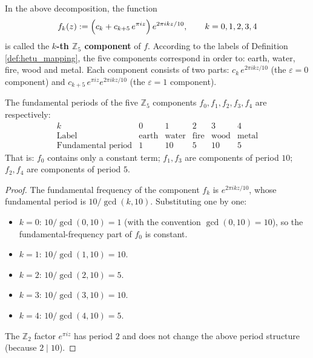 \begin{definition}\label{def:hetu_five_components}
In the above decomposition, the function
\[
f_k(z) := \Bigl( c_k + c_{k+5}\, e^{\pi i z} \Bigr)\, e^{2\pi i k z / 10}, \qquad k = 0, 1, 2, 3, 4
\]
is called the \textbf{$k$-th $\mathbb{Z}_5$ component} of $f$. According to the labels of Definition \ref{def:hetu_mapping}, the five components correspond in order to: earth, water, fire, wood and metal. Each component consists of two parts: $c_k\, e^{2\pi i k z / 10}$ (the $\varepsilon = 0$ component) and $c_{k+5}\, e^{\pi i z} e^{2\pi i k z / 10}$ (the $\varepsilon = 1$ component).
\end{definition}

\begin{proposition}\label{prop:hetu_five_periods}
The fundamental periods of the five $\mathbb{Z}_5$ components $f_0, f_1, f_2, f_3, f_4$ are respectively:
\[
\begin{array}{c|ccccc}
k & 0 & 1 & 2 & 3 & 4 \\
\hline
\text{Label} & \text{earth} & \text{water} & \text{fire} & \text{wood} & \text{metal} \\
\text{Fundamental period} & 1 & 10 & 5 & 10 & 5
\end{array}
\]
That is: $f_0$ contains only a constant term; $f_1, f_3$ are components of period $10$; $f_2, f_4$ are components of period $5$.
\end{proposition}

\begin{proof}
The fundamental frequency of the component $f_k$ is $e^{2\pi i k z / 10}$, whose fundamental period is $10/\gcd(k, 10)$. Substituting one by one:
\begin{itemize}
    \item $k = 0$: $10/\gcd(0,10) = 1$ (with the convention $\gcd(0,10) = 10$), so the fundamental-frequency part of $f_0$ is constant.
    \item $k = 1$: $10/\gcd(1,10) = 10$.
    \item $k = 2$: $10/\gcd(2,10) = 5$.
    \item $k = 3$: $10/\gcd(3,10) = 10$.
    \item $k = 4$: $10/\gcd(4,10) = 5$.
\end{itemize}
The $\mathbb{Z}_2$ factor $e^{\pi i z}$ has period $2$ and does not change the above period structure (because $2 \mid 10$).
\end{proof}

